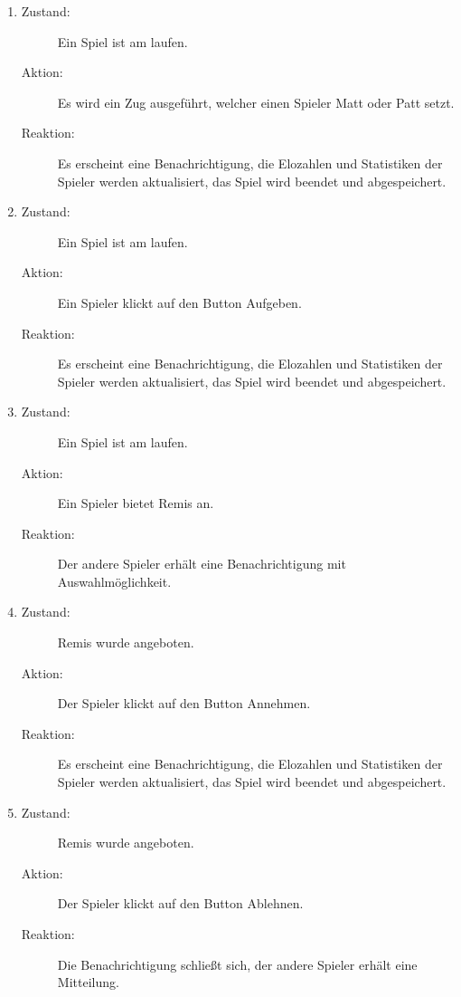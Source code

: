 \documentclass[parskip=full]{scrartcl}
\begin{document}
\begin{enumerate}
	\item
	\begin{description}
	\item[Zustand:] Ein Spiel ist am laufen.
	\item[Aktion:] Es wird ein Zug ausgeführt, welcher einen Spieler Matt oder Patt setzt.
	\item[Reaktion:] Es erscheint eine Benachrichtigung, die Elozahlen und Statistiken der Spieler werden aktualisiert, das Spiel wird beendet und abgespeichert.  \\
	\end{description}
	
	\item
	\begin{description}
	\item[Zustand:] Ein Spiel ist am laufen.
	\item[Aktion:] Ein Spieler klickt auf den Button \glqq Aufgeben\grqq.
	\item[Reaktion:] Es erscheint eine Benachrichtigung, die Elozahlen und Statistiken der Spieler werden aktualisiert, das Spiel wird beendet und abgespeichert.  \\
	\end{description}
	
	\item
	\begin{description}
	\item[Zustand:] Ein Spiel ist am laufen.
	\item[Aktion:] Ein Spieler bietet Remis an.
	\item[Reaktion:] Der andere Spieler erhält eine Benachrichtigung mit Auswahlmöglichkeit.  \\
	\end{description}
	
	\item
	\begin{description}
	\item[Zustand:] Remis wurde angeboten.
	\item[Aktion:] Der Spieler klickt auf den Button \glqq Annehmen\grqq.
	\item[Reaktion:] Es erscheint eine Benachrichtigung, die Elozahlen und Statistiken der Spieler werden aktualisiert, das Spiel wird beendet und abgespeichert.  \\
	\end{description}
	
	\item
	\begin{description}
	\item[Zustand:] Remis wurde angeboten.
	\item[Aktion:] Der Spieler klickt auf den Button \glqq Ablehnen\grqq.
	\item[Reaktion:] Die Benachrichtigung schließt sich, der andere Spieler erhält eine Mitteilung.  \\
	\end{description}
	
	
	
	
\end{enumerate}
\end{document}
